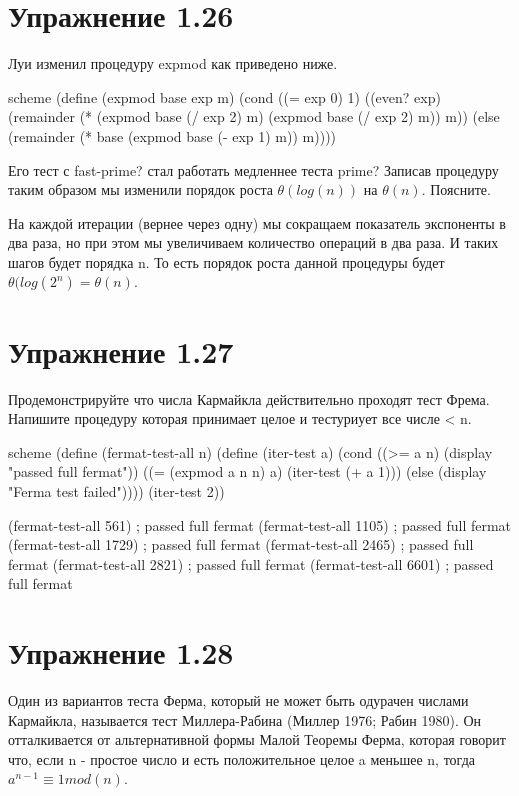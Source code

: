 \chapter{Упражнение 1.26}

Луи изменил процедуру expmod как приведено ниже.
\begin{codelisting}{scheme}
(define (expmod base exp m)
  (cond ((= exp 0) 1)
        ((even? exp)
         (remainder (* (expmod base (/ exp 2) m)
                       (expmod base (/ exp 2) m))
                    m))
        (else
         (remainder (* base (expmod base (- exp 1) m))
                    m))))
\end{codelisting}

Его тест с fast-prime? стал работать медленнее теста prime? Записав процедуру таким образом мы изменили порядок роста $\theta(log(n))$ на $\theta(n)$. Поясните.

На каждой итерации (вернее через одну) мы сокращаем показатель экспоненты в два раза, но при этом мы увеличиваем количество операций в два раза. И таких шагов будет порядка n. То есть порядок роста данной процедуры будет $\theta(log(2^n) = \theta(n)$.

\chapter{Упражнение 1.27}

Продемонстрируйте что числа Кармайкла действительно проходят тест Фрема.
Напишите процедуру которая принимает целое и тестуриует все числе < n.

\begin{codelisting}{scheme}
(define (fermat-test-all n)
  (define (iter-test a)
    (cond ((>= a n) (display "passed full fermat"))
          ((= (expmod a n n) a) (iter-test (+ a 1)))
          (else (display "Ferma test failed"))))
  (iter-test 2))

(fermat-test-all 561)  ; passed full fermat
(fermat-test-all 1105) ; passed full fermat
(fermat-test-all 1729) ; passed full fermat
(fermat-test-all 2465) ; passed full fermat
(fermat-test-all 2821) ; passed full fermat
(fermat-test-all 6601) ; passed full fermat
\end{codelisting}


\chapter{Упражнение 1.28}

Один из вариантов теста Ферма, который не может быть одурачен числами Кармайкла, называется тест Миллера-Рабина (Миллер 1976; Рабин 1980). Он отталкивается от альтернативной формы Малой Теоремы Ферма, которая говорит что, если n - простое число и есть положительное целое a меньшее n, тогда $a^{n-1} \equiv 1 mod(n)$.

